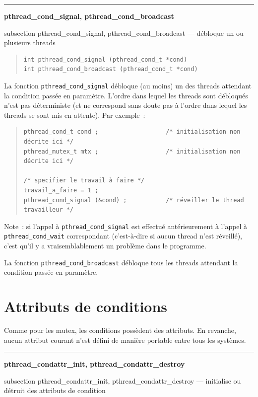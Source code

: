 \documentclass [twoside] {report}
\newcommand {\primitive} [1]
    {
	\phantomsection
	{\large \textbf {#1}}
	\addcontentsline {toc} {subsection} {#1}
    }
\newcommand {\separation}
    {
	\vspace {5mm}
	\nopagebreak
	\hrule
    }
\begin{document}
\separation
\primitive {pthread\_cond\_signal, pthread\_cond\_broadcast} --- débloque un ou plusieurs threads

\begin {quote}
\begin {verbatim}
int pthread_cond_signal (pthread_cond_t *cond)
int pthread_cond_broadcast (pthread_cond_t *cond)
\end{verbatim}
\end {quote}

La fonction \verb|pthread_cond_signal| débloque (au moins) un des threads
attendant la condition passée en paramètre. L'ordre dans lequel les
threads sont débloqués n'est pas déterministe (et ne correspond sans
doute pas à l'ordre dans lequel les threads se sont mis en attente).
Par exemple~:

\begin {quote}
\small
\begin {verbatim}
pthread_cond_t cond ;                   /* initialisation non décrite ici */
pthread_mutex_t mtx ;                   /* initialisation non décrite ici */

/* specifier le travail à faire */
travail_a_faire = 1 ;
pthread_cond_signal (&cond) ;           /* réveiller le thread travailleur */
\end{verbatim}
\end {quote}

Note~: si l'appel à \verb|pthread_cond_signal| est effectué
antérieurement à l'appel à \verb|pthread_cond_wait| correspondant
(c'est-à-dire si aucun thread n'est réveillé), c'est qu'il y a
vraisemblablement un problème dans le programme.

La fonction \verb|pthread_cond_broadcast| débloque tous les threads
attendant la condition passée en paramètre.


\section {Attributs de conditions}

Comme pour les mutex, les conditions possèdent des attributs. En
revanche, aucun attribut courant n'est défini de manière portable
entre tous les systèmes.


\separation
\primitive {pthread\_condattr\_init, pthread\_condattr\_destroy} --- initialise ou détruit des attributs de condition
\end{document}
